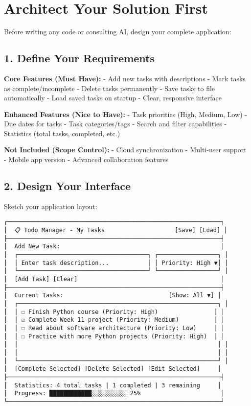\documentclass[
  letterpaper,
  DIV=11,
  numbers=noendperiod,
  oneside]{scrreprt}
\begin{document}
\section{Architect Your Solution
First}\label{architect-your-solution-first-11}

Before writing any code or consulting AI, design your complete
application:

\subsection{1. Define Your Requirements}\label{define-your-requirements}

\textbf{Core Features (Must Have):} - Add new tasks with descriptions -
Mark tasks as complete/incomplete - Delete tasks permanently - Save
tasks to file automatically - Load saved tasks on startup - Clear,
responsive interface

\textbf{Enhanced Features (Nice to Have):} - Task priorities (High,
Medium, Low) - Due dates for tasks - Task categories/tags - Search and
filter capabilities - Statistics (total tasks, completed, etc.)

\textbf{Not Included (Scope Control):} - Cloud synchronization -
Multi-user support - Mobile app version - Advanced collaboration
features

\subsection{2. Design Your Interface}\label{design-your-interface-1}

Sketch your application layout:

\begin{verbatim}
┌─────────────────────────────────────────────────────────────┐
│  📋 Todo Manager - My Tasks                    [Save] [Load] │
├─────────────────────────────────────────────────────────────┤
│  Add New Task:                                              │
│  ┌─────────────────────────────────────┐ ┌─────────────────┐ │
│  │ Enter task description...           │ │ Priority: High ▼│ │
│  └─────────────────────────────────────┘ └─────────────────┘ │
│  [Add Task] [Clear]                                         │
├─────────────────────────────────────────────────────────────┤
│  Current Tasks:                              [Show: All ▼] │
│  ┌─────────────────────────────────────────────────────────┐ │
│  │ ☐ Finish Python course (Priority: High)                │ │
│  │ ☑ Complete Week 11 project (Priority: Medium)          │ │
│  │ ☐ Read about software architecture (Priority: Low)     │ │
│  │ ☐ Practice with more Python projects (Priority: High)  │ │
│  │                                                         │ │
│  │                                                         │ │
│  └─────────────────────────────────────────────────────────┘ │
│  [Complete Selected] [Delete Selected] [Edit Selected]     │
├─────────────────────────────────────────────────────────────┤
│  Statistics: 4 total tasks | 1 completed | 3 remaining     │
│  Progress: ████████████░░░░░░░░░░ 25%                       │
└─────────────────────────────────────────────────────────────┘
\end{verbatim}
\end{document}
